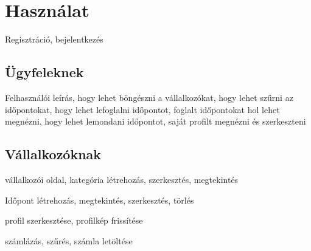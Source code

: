 \section{Használat}

Regisztráció, bejelentkezés

\subsection{Ügyfeleknek}
Felhasználói leírás, hogy lehet böngészni a vállalkozókat, hogy lehet szűrni az időpontokat, hogy lehet lefoglalni időpontot, foglalt időpontokat hol lehet megnézni, hogy lehet lemondani időpontot, saját profilt megnézni és szerkeszteni

\subsection{Vállalkozóknak}
vállalkozói oldal, kategória létrehozás, szerkesztés, megtekintés

Időpont létrehozás, megtekintés, szerkesztés, törlés

profil szerkesztése, profilkép frissítése

számlázás, szűrés, számla letöltése






















